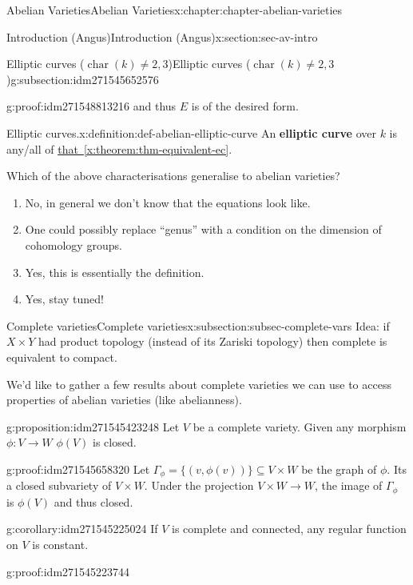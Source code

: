 \documentclass[oneside,10pt,]{book}
\newcommand{\terminology}[1]{\textbf{#1}}
\numberwithin{equation}{section}
\DeclareMathOperator{\characteristic}{char}
\begin{document}
\begin{chapterptx}{Abelian Varieties}{}{Abelian Varieties}{}{}{x:chapter:chapter-abelian-varieties}
\begin{sectionptx}{Introduction (Angus)}{}{Introduction (Angus)}{}{}{x:section:sec-av-intro}
\begin{subsectionptx}{Elliptic curves (\(\characteristic(k) \ne 2,3\))}{}{Elliptic curves (\(\characteristic(k) \ne 2,3\))}{}{}{g:subsection:idm271545652576}
\begin{proofptx}{}{g:proof:idm271548813216}
and thus \(E\) is of the desired form.%
\end{proofptx}
\begin{definition}{Elliptic curves.}{x:definition:def-abelian-elliptic-curve}%
An \terminology{elliptic curve} over \(k\) is any\slash{}all of \hyperref[x:theorem:thm-equivalent-ec]{that~\ref{x:theorem:thm-equivalent-ec}}.%
\end{definition}
Which of the above characterisations generalise to abelian varieties?%
\begin{enumerate}
\item{}No, in general we don't know that the equations look like.%
\item{}One could possibly replace ``genus'' with a condition on the dimension of cohomology groups.%
\item{}Yes, this is essentially the definition.%
\item{}Yes, stay tuned!%
\end{enumerate}
%
\end{subsectionptx}
%
%
\typeout{************************************************}
\typeout{************************************************}
%
\begin{subsectionptx}{Complete varieties}{}{Complete varieties}{}{}{x:subsection:subsec-complete-vars}
Idea: if \(X \times Y\) had product topology (instead of its Zariski topology) then complete is equivalent to compact.%
\par
We'd like to gather a few results about complete varieties we can use to access properties of abelian varieties (like abelianness).%
\begin{proposition}{}{}{g:proposition:idm271545423248}%
Let \(V\) be a complete variety. Given any morphism \(\phi\colon V \to W\) \(\phi (V) \) is closed.%
\end{proposition}
\begin{proofptx}{}{g:proof:idm271545658320}
Let \(\Gamma_\phi = \{(v, \phi(v))\} \subseteq V\times W\) be the graph of \(\phi\). Its a closed subvariety of \(V\times W\). Under the projection \(V\times W \to W\), the image of \(\Gamma_\phi\) is \(\phi(V)\) and thus closed.%
\end{proofptx}
\begin{corollary}{}{}{g:corollary:idm271545225024}%
If \(V\) is complete and connected, any regular function on \(V\) is constant.%
\end{corollary}
\begin{proofptx}{}{g:proof:idm271545223744}

\end{proofptx}
\end{subsectionptx}
\end{sectionptx}
\end{chapterptx}
\end{document}
